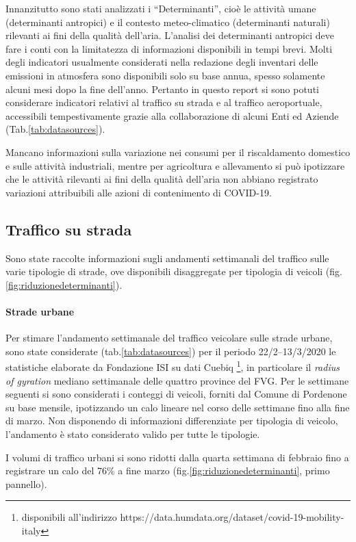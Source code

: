 Innanzitutto sono stati analizzati i ``Determinanti'', cioè le attività umane (determinanti antropici) e il contesto meteo-climatico (determinanti naturali) rilevanti ai fini della qualità dell'aria. L'analisi dei determinanti antropici deve fare i conti con la limitatezza di informazioni disponibili in tempi brevi. Molti degli indicatori usualmente considerati nella redazione degli inventari delle emissioni in atmosfera sono disponibili solo su base annua, spesso solamente alcuni mesi dopo la fine dell'anno. Pertanto in questo report si sono potuti considerare indicatori relativi al traffico su strada e al traffico aeroportuale, accessibili tempestivamente grazie alla collaborazione di alcuni Enti ed Aziende (Tab.\ref{tab:datasources}).

Mancano informazioni sulla variazione nei consumi per il riscaldamento domestico e sulle attività industriali, mentre per agricoltura e allevamento si può ipotizzare che le attività rilevanti ai fini della qualità dell'aria non abbiano registrato variazioni attribuibili alle azioni di contenimento di COVID-19.


\subsection{Traffico su strada}

Sono state raccolte informazioni sugli andamenti settimanali del traffico sulle varie tipologie di strade, ove disponibili disaggregate per tipologia di veicoli (fig.\ref{fig:riduzionedeterminanti}).
\paragraph{Strade urbane}
Per stimare l'andamento settimanale del traffico veicolare sulle strade urbane, sono state considerate (tab.\ref{tab:datasources}) per il periodo 22/2--13/3/2020 le statistiche elaborate da Fondazione ISI su dati Cuebiq \citep{pepe2020covid}\footnote{disponibili all'indirizzo https://data.humdata.org/dataset/covid-19-mobility-italy}, in particolare il \textit{radius of gyration} mediano settimanale delle quattro province del FVG. Per le settimane seguenti si sono considerati i conteggi di veicoli, forniti dal Comune di Pordenone su base mensile, ipotizzando un calo lineare nel corso delle settimane fino alla fine di marzo. Non disponendo di informazioni differenziate per tipologia di veicolo, l'andamento è stato considerato valido per tutte le tipologie.

I volumi di traffico urbani si sono ridotti dalla quarta settimana di febbraio fino a registrare un calo del 76\% a fine marzo (fig.\ref{fig:riduzionedeterminanti}, primo pannello).

